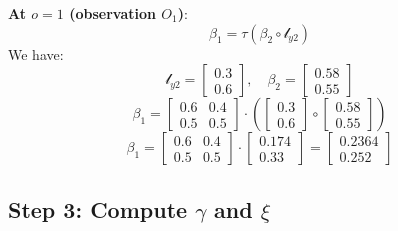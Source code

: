   \textbf{At \( o = 1 \) (observation \( O_1 \))}:
  \[
  \beta_1 = \tau (\beta_2 \circ \mathcal{l}_{y2}) 
  \]
  We have:
  \[
  \mathcal{l}_{y2} = \begin{bmatrix} 0.3 \\ 0.6 \end{bmatrix}, \quad \beta_2 = \begin{bmatrix} 0.58 \\ 0.55 \end{bmatrix}
  \]
  \[
  \beta_1 = \begin{bmatrix} 0.6 & 0.4 \\ 0.5 & 0.5 \end{bmatrix} \cdot \left(\begin{bmatrix} 0.3 \\ 0.6 \end{bmatrix} \circ \begin{bmatrix} 0.58 \\ 0.55 \end{bmatrix}\right) 
  \]
  \[
  \beta_1 = \begin{bmatrix} 0.6 & 0.4 \\ 0.5 & 0.5 \end{bmatrix} \cdot \begin{bmatrix} 0.174 \\ 0.33 \end{bmatrix} = \begin{bmatrix} 0.2364 \\ 0.252\end{bmatrix}
  \]

\subsection{Step 3: Compute \( \gamma \) and \( \xi \)}

